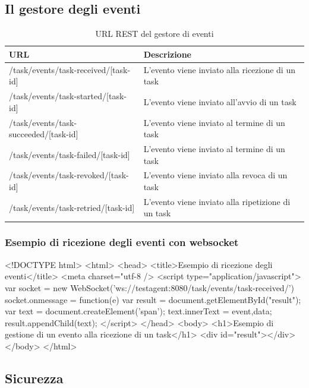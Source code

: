\subsection{Il gestore degli eventi} %
\begin{table}[h]
\centering
\begin{tabular}{| m{4.4cm}| m{5cm} | }
\hline
\textbf{URL} & \textbf{Descrizione} \\ \hline
/task/events/task-received/[task-id] & L'evento viene inviato alla ricezione di un task\\ \hline
/task/events/task-started/[task-id] & L'evento viene inviato all'avvio di un task\\ \hline
/task/events/task-succeeded/[task-id] & L'evento viene inviato al termine di un task\\ \hline
/task/events/task-failed/[task-id]  & L'evento viene inviato al termine di un task\\ \hline
/task/events/task-revoked/[task-id] & L'evento viene inviato alla revoca di un task\\ \hline
/task/events/task-retried/[task-id] & L'evento viene inviato alla ripetizione di un task\\ \hline
\end{tabular}
\caption{URL REST del gestore di eventi}
\label{tab:events urls}
\end{table}
\subsubsection{Esempio di ricezione degli eventi con websocket}
\begin{html}
<!DOCTYPE html>
<html>
    <head>
        <title>Esempio di ricezione degli eventi</title>
        <meta charset="utf-8 />
        <script type="application/javascript">
            var socket = new WebSocket('ws://testagent:8080/task/events/task-received/')
            socket.onmessage = function(e) {
                var result = document.getElementById("result");
                var text = document.createElement('span');
                text.innerText = event,data;
                result.appendChild(text);
            }
        </script>
    </head>
    <body>
        <h1>Esempio di gestione di un evento alla ricezione di un task</h1>
        <div id="result"></div>
    </body>
</html>
\end{html}
\subsection{Sicurezza}


